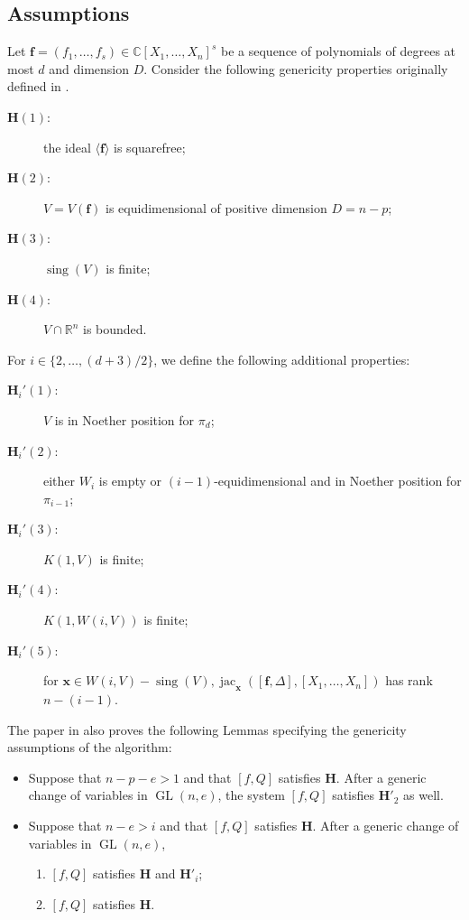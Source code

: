 \documentclass[12pt]{article}
\DeclareMathOperator{\sing}{sing}
\DeclareMathOperator{\jac}{jac}
\def\C{\mathbb{C}}
\def\R{\mathbb{R}}
\def\C{\mathbb{C}}
\def\R{\mathbb{R}}
\begin{document}
\subsection{Assumptions}
Let $\bm f = (f_1,\hdots,f_s) \in  \C[X_1,\hdots,X_n]^s$ be a sequence of polynomials of degrees at most $d$ and dimension $D$. Consider the following genericity properties originally defined in \cite{SchostMohabBabySteps2011}. 
\begin{description}
\item [$\bm H(1):$] the ideal $\langle \bm f \rangle$ is squarefree; 
\item [$\bm H(2):$] $V = V(\bm f)$ is equidimensional of positive dimension $D=n-p$;
\item [$\bm H(3):$] $\sing(V)$ is finite;
\item [$\bm H(4):$] $V \cap \R^n$ is bounded. 
\end{description}
%
For $i \in \{2,\hdots,(d+3)/2\}$, we define the following additional properties: 
%
%
\begin{description}
\item [$\bm H_i'(1):$] $V$ is in Noether position for $\pi_d$; 
\item [$\bm H_i'(2):$] either $W_i$ is empty or $(i-1)$-equidimensional and in Noether position for $\pi_{i-1}$;
\item [$\bm H_i'(3):$] $K(1,V)$ is finite;
\item [$\bm H_i'(4):$] $K(1,W(i,V))$ is finite; 
\item [$\bm H_i'(5):$] for $\bm x \in W(i,V)-\sing(V), \jac_{\bm x}([\bm f, \Delta],[X_1,\hdots,X_n])$ has rank $n-(i-1).$
\end{description}
%
The paper in \cite{SchostMohabBabySteps2011} also proves the following Lemmas specifying the genericity assumptions of the algorithm:
%
\begin{itemize}
    \item \cite[Lemma 31:]{SchostMohabBabySteps2011} Suppose that $n - p - e > 1$ and that $[f, Q]$ satisfies $\bm H$. After a generic change of variables in $\operatorname{GL}(n, e)$, the system $[f, Q]$ satisfies $\bm H'_2$ as well.
    \item \cite[Lemma 34.]{SchostMohabBabySteps2011} Suppose that $n - e > i$ and that $[f, Q]$ satisfies $\bm H$. After a generic change of variables in $\operatorname{GL}(n, e)$,
    \begin{enumerate}\renewcommand{\labelenumi}{(\alph{enumi})}
        \item $[f, Q]$ satisfies $\bm H$ and $\bm H'_i$;
        \item $[f, Q]$ satisfies $\bm H$.
    \end{enumerate}
\end{itemize}
\end{document}

